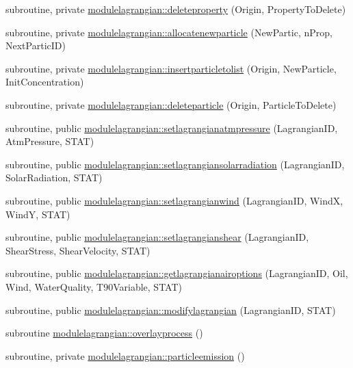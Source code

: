 \begin{DoxyCompactItemize}
\item 
subroutine, private \mbox{\hyperlink{namespacemodulelagrangian_abff255f913afc4b6a6e6434a97f541f9}{modulelagrangian\+::deleteproperty}} (Origin, Property\+To\+Delete)
\item 
subroutine, private \mbox{\hyperlink{namespacemodulelagrangian_aaf265958f7abd87e754e7ff44745bdf0}{modulelagrangian\+::allocatenewparticle}} (New\+Partic, n\+Prop, Next\+Partic\+ID)
\item 
subroutine, private \mbox{\hyperlink{namespacemodulelagrangian_a96b3fbaf01697148bac38553d6198dc3}{modulelagrangian\+::insertparticletolist}} (Origin, New\+Particle, Init\+Concentration)
\item 
subroutine, private \mbox{\hyperlink{namespacemodulelagrangian_a0acccf68f63b061b6ad6122ccbe76ac1}{modulelagrangian\+::deleteparticle}} (Origin, Particle\+To\+Delete)
\item 
subroutine, public \mbox{\hyperlink{namespacemodulelagrangian_a219357c04fe0cbde7c3506f0fdb4ec61}{modulelagrangian\+::setlagrangianatmpressure}} (Lagrangian\+ID, Atm\+Pressure, S\+T\+AT)
\item 
subroutine, public \mbox{\hyperlink{namespacemodulelagrangian_a26def3f84c8200513c53ea500f051cdd}{modulelagrangian\+::setlagrangiansolarradiation}} (Lagrangian\+ID, Solar\+Radiation, S\+T\+AT)
\item 
subroutine, public \mbox{\hyperlink{namespacemodulelagrangian_ab06dca3c92c46b6fb4d05e0c79c7fbd6}{modulelagrangian\+::setlagrangianwind}} (Lagrangian\+ID, WindX, WindY, S\+T\+AT)
\item 
subroutine, public \mbox{\hyperlink{namespacemodulelagrangian_ab0d8db7a7c4e175fc509a8c3e6e6efab}{modulelagrangian\+::setlagrangianshear}} (Lagrangian\+ID, Shear\+Stress, Shear\+Velocity, S\+T\+AT)
\item 
subroutine, public \mbox{\hyperlink{namespacemodulelagrangian_acfabdebec80bc9e9353be9b171fdbbdb}{modulelagrangian\+::getlagrangianairoptions}} (Lagrangian\+ID, Oil, Wind, Water\+Quality, T90\+Variable, S\+T\+AT)
\item 
subroutine, public \mbox{\hyperlink{namespacemodulelagrangian_a1097f962a7a848d12f7f3036993f7b93}{modulelagrangian\+::modifylagrangian}} (Lagrangian\+ID, S\+T\+AT)
\item 
subroutine \mbox{\hyperlink{namespacemodulelagrangian_ac5c97cbe4a964c4bf8de40af414143c0}{modulelagrangian\+::overlayprocess}} ()
\item 
subroutine, private \mbox{\hyperlink{namespacemodulelagrangian_a529648b66afb4cc44ecf46c2557c0c35}{modulelagrangian\+::particleemission}} ()

\end{DoxyCompactItemize}
